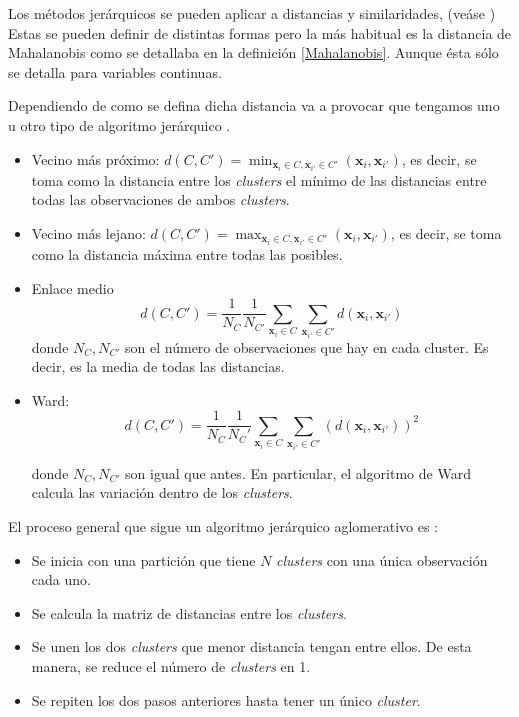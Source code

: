 \noindent Los métodos jerárquicos se pueden aplicar a distancias y similaridades, (veáse \cite{Mardia 1979}) Estas se pueden definir de distintas formas pero la más habitual es la distancia de Mahalanobis como se detallaba en la definición \ref{Mahalanobis}. Aunque ésta sólo se detalla para variables continuas. 

\noindent Dependiendo de como se defina dicha distancia va a provocar que tengamos uno u otro tipo de algoritmo jerárquico \cite{Everitt 2011, Johnson 2007, Peña 2002}.
\begin{itemize}
\item Vecino más próximo: $d(C,C')=\min_{\mathbf{x}_i\in C, \mathbf{x}_{i'}\in C'}(\mathbf{x}_i,\mathbf{x}_{i'})$, es decir, se toma como la distancia entre los \emph{clusters} el mínimo de las distancias entre todas las observaciones de ambos \emph{clusters}.
\item Vecino más lejano: $d(C,C')=\max_{\mathbf{x}_i\in C, \mathbf{x}_{i'}\in C'}(\mathbf{x}_i,\mathbf{x}_{i'})$, es decir, se toma como la distancia máxima entre todas las posibles. 
\item Enlace medio \begin{equation}
d(C,C')=\dfrac{1}{N_C}\dfrac{1}{N_{C'}}\sum_{\mathbf{x}_i\in C}\sum_{\mathbf{x}_{i'}\in C'} d(\mathbf{x}_i, \mathbf{x}_{i'})
\end{equation}
donde $N_C, N_{C'}$ son el número de observaciones que hay en cada cluster. Es decir, es la media de todas las distancias. 
\item Ward:
\begin{equation}
d(C,C')=\dfrac{1}{N_C}\dfrac{1}{N_C'}\sum_{\mathbf{x}_i\in C}\sum_{\mathbf{x}_{i'}\in C'} (d(\mathbf{x}_i, \mathbf{x}_{i'}))^2
\end{equation} 

donde $N_C, N_{C'}$ son igual que antes. En particular, el algoritmo de Ward calcula las variación dentro de los \emph{clusters}.
\end{itemize}

\noindent El proceso general que sigue un algoritmo jerárquico aglomerativo es :

\begin{itemize}
\item Se inicia con una partición que tiene $N$ \emph{clusters} con una única observación cada uno.
\item Se calcula la matriz de distancias entre los \emph{clusters}. 
\item Se unen los dos \emph{clusters} que menor distancia tengan entre ellos. De esta manera, se reduce el número de \emph{clusters} en 1.  
\item Se repiten los dos pasos anteriores hasta tener un único \emph{cluster}. 
\end{itemize}

